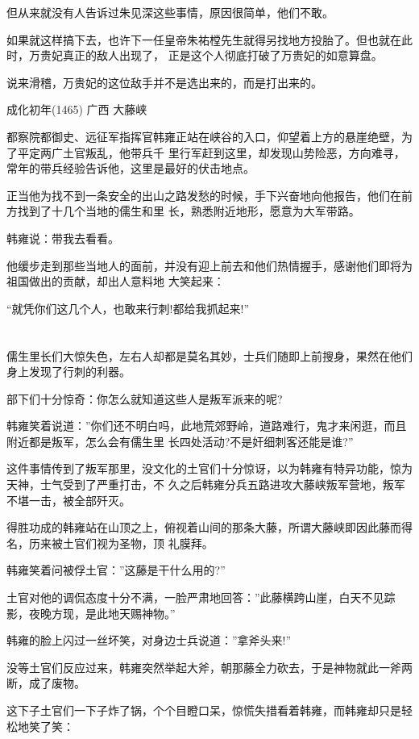 \documentclass[11pt,a4paper,onecolumn]{article}
\begin{document}
但从来就没有人告诉过朱见深这些事情，原因很简单，他们不敢。

如果就这样搞下去，也许下一任皇帝朱祐樘先生就得另找地方投胎了。但也就在此时，万贵妃真正的敌人出现了，
正是这个人彻底打破了万贵妃的如意算盘。

说来滑稽，万贵妃的这位敌手并不是选出来的，而是打出来的。

成化初年(1465) 广西 大藤峡

都察院都御史、远征军指挥官韩雍正站在峡谷的入口，仰望着上方的悬崖绝壁，为了平定两广土官叛乱，他带兵千
里行军赶到这里，却发现山势险恶，方向难寻，常年的带兵经验告诉他，这里是最好的伏击地点。

正当他为找不到一条安全的出山之路发愁的时候，手下兴奋地向他报告，他们在前方找到了十几个当地的儒生和里
长，熟悉附近地形，愿意为大军带路。

韩雍说：带我去看看。

他缓步走到那些当地人的面前，并没有迎上前去和他们热情握手，感谢他们即将为祖国做出的贡献，却出人意料地
大笑起来：

``就凭你们这几个人，也敢来行刺!都给我抓起来!''

\section[\thesection]{}

儒生里长们大惊失色，左右人却都是莫名其妙，士兵们随即上前搜身，果然在他们身上发现了行刺的利器。

部下们十分惊奇：你怎么就知道这些人是叛军派来的呢?

韩雍笑着说道：''你们还不明白吗，此地荒郊野岭，道路难行，鬼才来闲逛，而且附近都是叛军，怎么会有儒生里
长四处活动?不是奸细刺客还能是谁?''

这件事情传到了叛军那里，没文化的土官们十分惊讶，以为韩雍有特异功能，惊为天神，士气受到了严重打击，不
久之后韩雍分兵五路进攻大藤峡叛军营地，叛军不堪一击，被全部歼灭。

得胜功成的韩雍站在山顶之上，俯视着山间的那条大藤，所谓大藤峡即因此藤而得名，历来被土官们视为圣物，顶
礼膜拜。

韩雍笑着问被俘土官：''这藤是干什么用的?''

土官对他的调侃态度十分不满，一脸严肃地回答：''此藤横跨山崖，白天不见踪影，夜晚方现，是此地天赐神物。''

韩雍的脸上闪过一丝坏笑，对身边士兵说道：''拿斧头来!''

没等土官们反应过来，韩雍突然举起大斧，朝那藤全力砍去，于是神物就此一斧两断，成了废物。

这下子土官们一下子炸了锅，个个目瞪口呆，惊慌失措看着韩雍，而韩雍却只是轻松地笑了笑：
\end{document}
